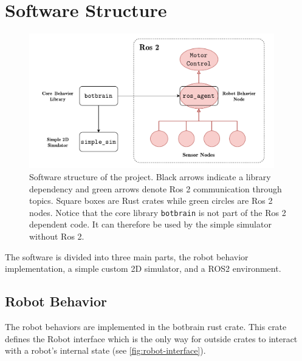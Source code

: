 \section{Software Structure}
\begin{figure}
    \begin{center}
        \includegraphics[width=0.95\textwidth]{figures/software-structure.pdf}
    \end{center}
    \caption{Software structure of the project. Black arrows indicate a library dependency and green arrows denote Ros 2 communication through topics. Square boxes are Rust crates while green circles are Ros 2 nodes. Notice that the core library \texttt{botbrain} is not part of the Ros 2 dependent code. It can therefore be used by the simple simulator without Ros 2.}\label{fig:}
\end{figure}


The software is divided into three main parts, the robot behavior implementation, a simple custom 2D
simulator, and a ROS2 environment.

\subsection{Robot Behavior}
The robot behaviors are implemented in the botbrain rust crate. This crate defines the Robot interface
which is the only way for outside crates to interact with a robot’s internal state (see \cref{fig:robot-interface}).

